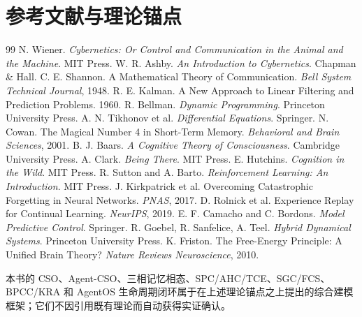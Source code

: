 \chapter*{参考文献与理论锚点}
\begin{thebibliography}{99}
 N. Wiener. \textit{Cybernetics: Or Control and Communication in the Animal and the Machine}. MIT Press.
 W. R. Ashby. \textit{An Introduction to Cybernetics}. Chapman \& Hall.
 C. E. Shannon. A Mathematical Theory of Communication. \textit{Bell System Technical Journal}, 1948.
 R. E. Kalman. A New Approach to Linear Filtering and Prediction Problems. 1960.
 R. Bellman. \textit{Dynamic Programming}. Princeton University Press.
 A. N. Tikhonov et al. \textit{Differential Equations}. Springer.
 N. Cowan. The Magical Number 4 in Short-Term Memory. \textit{Behavioral and Brain Sciences}, 2001.
 B. J. Baars. \textit{A Cognitive Theory of Consciousness}. Cambridge University Press.
 A. Clark. \textit{Being There}. MIT Press.
 E. Hutchins. \textit{Cognition in the Wild}. MIT Press.
 R. Sutton and A. Barto. \textit{Reinforcement Learning: An Introduction}. MIT Press.
 J. Kirkpatrick et al. Overcoming Catastrophic Forgetting in Neural Networks. \textit{PNAS}, 2017.
 D. Rolnick et al. Experience Replay for Continual Learning. \textit{NeurIPS}, 2019.
 E. F. Camacho and C. Bordons. \textit{Model Predictive Control}. Springer.
 R. Goebel, R. Sanfelice, A. Teel. \textit{Hybrid Dynamical Systems}. Princeton University Press.
 K. Friston. The Free-Energy Principle: A Unified Brain Theory? \textit{Nature Reviews Neuroscience}, 2010.
\end{thebibliography}

本书的 CSO、Agent-CSO、三相记忆相态、SPC/AHC/TCE、SGC/FCS、BPCC/KRA 和 AgentOS 生命周期闭环属于在上述理论锚点之上提出的综合建模框架；它们不因引用既有理论而自动获得实证确认。
